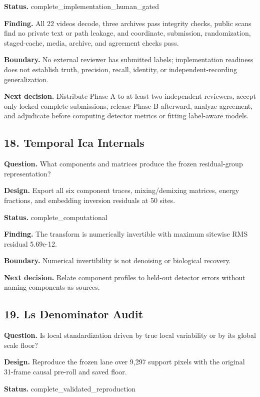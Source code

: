 \textbf{Status.} complete\_implementation\_human\_gated

\textbf{Finding.} All 22 videos decode, three archives pass integrity checks, public scans find no private text or path leakage, and coordinate, submission, randomization, staged-cache, media, archive, and agreement checks pass.

\textbf{Boundary.} No external reviewer has submitted labels; implementation readiness does not establish truth, precision, recall, identity, or independent-recording generalization.

\textbf{Next decision.} Distribute Phase A to at least two independent reviewers, accept only locked complete submissions, release Phase B afterward, analyze agreement, and adjudicate before computing detector metrics or fitting label-aware models.

\subsection{18. Temporal Ica Internals}

\textbf{Question.} What components and matrices produce the frozen residual-group representation?

\textbf{Design.} Export all six component traces, mixing/demixing matrices, energy fractions, and embedding inversion residuals at 50 sites.

\textbf{Status.} complete\_computational

\textbf{Finding.} The transform is numerically invertible with maximum sitewise RMS residual 5.69e-12.

\textbf{Boundary.} Numerical invertibility is not denoising or biological recovery.

\textbf{Next decision.} Relate component profiles to held-out detector errors without naming components as sources.

\subsection{19. Ls Denominator Audit}

\textbf{Question.} Is local standardization driven by true local variability or by its global scale floor?

\textbf{Design.} Reproduce the frozen lane over 9,297 support pixels with the original 31-frame causal pre-roll and saved floor.

\textbf{Status.} complete\_validated\_reproduction

